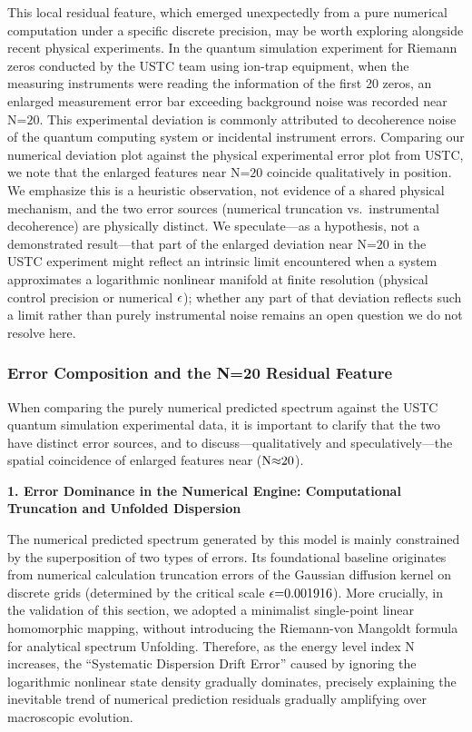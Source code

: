 \documentclass[fractalfract,article,submit,oneauthor,pdftex]{Definitions/mdpi}
\begin{document}
This local residual feature, which emerged unexpectedly from a pure
numerical computation under a specific discrete precision, may be worth
exploring alongside recent physical experiments.
In the quantum simulation experiment for Riemann zeros conducted by the
USTC team using ion-trap equipment, when the measuring instruments were
reading the information of the first 20 zeros, an enlarged measurement
error bar exceeding background noise was recorded near
\(\text{N}\text{=20}\). This experimental deviation is commonly
attributed to decoherence noise of the quantum computing system or
incidental instrument errors. Comparing our
numerical deviation plot against the physical experimental error
plot from USTC, we note that the enlarged features near
\(\text{N}\text{=20}\) coincide qualitatively in
position. We emphasize this is a heuristic observation, not evidence of
a shared physical mechanism, and the two error sources (numerical
truncation vs.~instrumental decoherence) are physically distinct. We
speculate---as a hypothesis, not a demonstrated result---that part of
the enlarged deviation near \(\text{N}\text{=20}\) in the USTC experiment
might reflect an intrinsic limit encountered when a system approximates a
logarithmic nonlinear manifold at finite resolution (physical control
precision or numerical \(\text{\ensuremath{\epsilon}}\)); whether any part of that
deviation reflects such a limit rather than purely instrumental noise
remains an open question we do not resolve here.

\subsubsection{Error Composition and the N=20 Residual Feature}

When comparing the purely numerical predicted spectrum against the
USTC quantum simulation experimental data, it is important to clarify
that the two have distinct error sources, and to discuss---qualitatively
and speculatively---the spatial coincidence of enlarged features near
(\(\text{N}\text{\ensuremath{\approx}20}\)).

\textbf{1. Error Dominance in the Numerical Engine: Computational
Truncation and Unfolded Dispersion}

The numerical predicted spectrum generated by this model is mainly
constrained by the superposition of two types of errors. Its
foundational baseline originates from numerical calculation truncation
errors of the Gaussian diffusion kernel on discrete grids (determined by
the critical scale \(\text{\ensuremath{\epsilon}=0.001916}\)). More crucially, in the
validation of this section, we adopted a minimalist single-point linear
homomorphic mapping, without introducing the Riemann-von Mangoldt
formula for analytical spectrum Unfolding. Therefore, as the energy
level index \(\text{N}\) increases, the ``Systematic Dispersion Drift
Error'' caused by ignoring the logarithmic nonlinear state density
gradually dominates, precisely explaining the inevitable trend of
numerical prediction residuals gradually amplifying over macroscopic
evolution.
\end{document}
